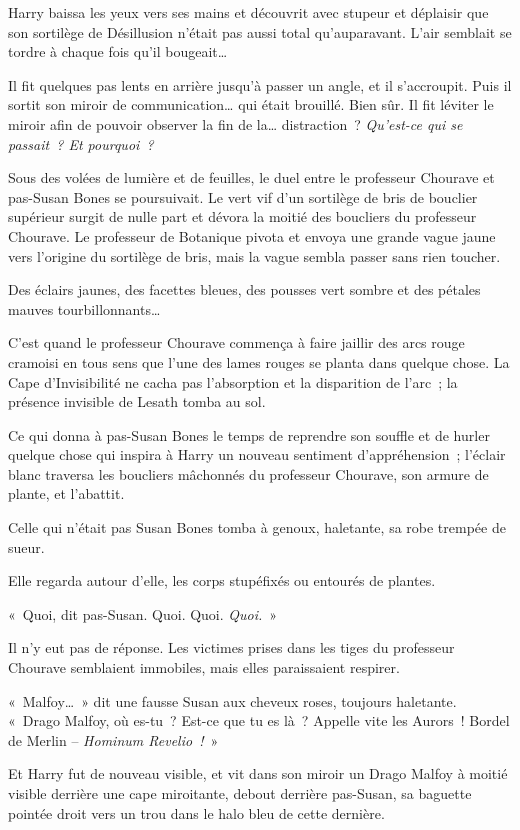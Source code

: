 Harry baissa les yeux vers ses mains et découvrit avec stupeur et déplaisir que son sortilège de Désillusion n'était pas aussi total qu'auparavant.
L'air semblait se tordre à chaque fois qu'il bougeait…

Il fit quelques pas lents en arrière jusqu'à passer un angle, et il s'accroupit.
Puis il sortit son miroir de communication… qui était brouillé.
Bien sûr.
Il fit léviter le miroir afin de pouvoir observer la fin de la… distraction~?
\emph{Qu'est-ce qui se passait~?
Et pourquoi~?}

Sous des volées de lumière et de feuilles, le duel entre le professeur Chourave et pas-Susan Bones se poursuivait.
Le vert vif d'un sortilège de bris de bouclier supérieur surgit de nulle part et dévora la moitié des boucliers du professeur Chourave.
Le professeur de Botanique pivota et envoya une grande vague jaune vers l'origine du sortilège de bris, mais la vague sembla passer sans rien toucher.

Des éclairs jaunes, des facettes bleues, des pousses vert sombre et des pétales mauves tourbillonnants…

C'est quand le professeur Chourave commença à faire jaillir des arcs rouge cramoisi en tous sens que l'une des lames rouges se planta dans quelque chose.
La Cape d'Invisibilité ne cacha pas l'absorption et la disparition de l'arc~; la présence invisible de Lesath tomba au sol.

Ce qui donna à pas-Susan Bones le temps de reprendre son souffle et de hurler quelque chose qui inspira à Harry un nouveau sentiment d'appréhension~; l'éclair blanc traversa les boucliers mâchonnés du professeur Chourave, son armure de plante, et l'abattit.

Celle qui n'était pas Susan Bones tomba à genoux, haletante, sa robe trempée de sueur.

Elle regarda autour d'elle, les corps stupéfixés ou entourés de plantes.

«~Quoi, dit pas-Susan.
Quoi. Quoi.
\emph{Quoi.}~»

Il n'y eut pas de réponse.
Les victimes prises dans les tiges du professeur Chourave semblaient immobiles, mais elles paraissaient respirer.

«~Malfoy…~»
dit une fausse Susan aux cheveux roses, toujours haletante.
«~Drago Malfoy, où es-tu~?
Est-ce que tu es là~?
Appelle vite les Aurors~!
Bordel de Merlin -- \emph{Hominum Revelio~!}~»

Et Harry fut de nouveau visible, et vit dans son miroir un Drago Malfoy à moitié visible derrière une cape miroitante, debout derrière pas-Susan, sa baguette pointée droit vers un trou dans le halo bleu de cette dernière.

